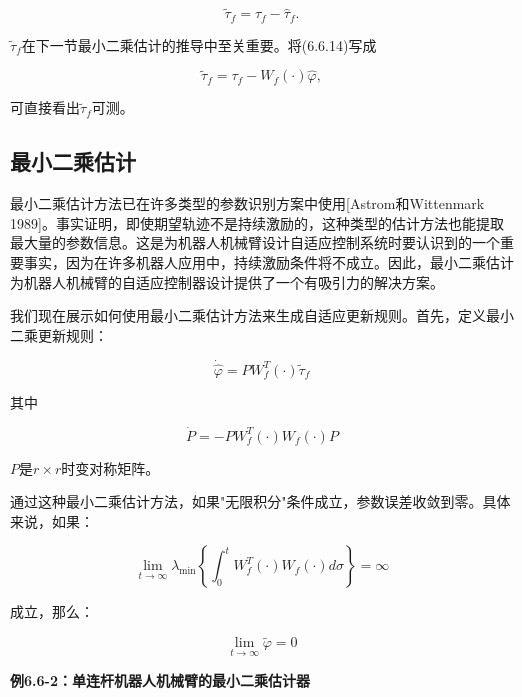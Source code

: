\documentclass[12pt,a4paper]{ctexart}
\begin{document}
\begin{equation}\label{eq:6.6.14}
\tilde{\tau}_f = \tau_f - \hat{\tau}_f.
\end{equation}

$\tilde{\tau}_f$在下一节最小二乘估计的推导中至关重要。将(6.6.14)写成

\begin{equation}\label{eq:6.6.15}
\tilde{\tau}_f = \tau_f - W_f(\cdot)\hat{\varphi},
\end{equation}

可直接看出$\tilde{\tau}_f$可测。

\subsection*{最小二乘估计}

最小二乘估计方法已在许多类型的参数识别方案中使用[Astrom和Wittenmark 1989]。事实证明，即使期望轨迹不是持续激励的，这种类型的估计方法也能提取最大量的参数信息。这是为机器人机械臂设计自适应控制系统时要认识到的一个重要事实，因为在许多机器人应用中，持续激励条件将不成立。因此，最小二乘估计为机器人机械臂的自适应控制器设计提供了一个有吸引力的解决方案。

我们现在展示如何使用最小二乘估计方法来生成自适应更新规则。首先，定义最小二乘更新规则：

\begin{equation}\label{eq:6.6.16}
\dot{\hat{\varphi}} = P W_f^T(\cdot)\tilde{\tau}_f
\end{equation}

其中

\begin{equation}\label{eq:6.6.17}
\dot{P} = -P W_f^T(\cdot)W_f(\cdot)P
\end{equation}

$P$是$r \times r$时变对称矩阵。

通过这种最小二乘估计方法，如果"无限积分"条件成立，参数误差收敛到零。具体来说，如果：

\begin{equation}\label{eq:6.6.18}
\lim_{t \to \infty} \lambda_{\min}\left\{\int_0^t W_f^T(\cdot)W_f(\cdot)d\sigma\right\} = \infty
\end{equation}

成立，那么：

\begin{equation}\label{eq:6.6.19}
\lim_{t \to \infty} \tilde{\varphi} = 0
\end{equation}

\textbf{例6.6-2：单连杆机器人机械臂的最小二乘估计器}
\end{document}
